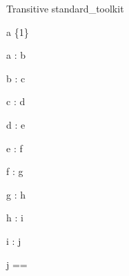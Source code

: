 \begin{zsection}
  \SECTION Transitive \parents standard\_toolkit
\end{zsection}

\begin{axdef}
\where
  a \in \{1\}
\end{axdef}

\begin{axdef}
  a : b
\end{axdef}

\begin{axdef}
  b : c
\end{axdef}

\begin{axdef}
  c : d
\end{axdef}

\begin{axdef}
  d : e
\end{axdef}

\begin{axdef}
  e : f
\end{axdef}

\begin{axdef}
  f : g
\end{axdef}

\begin{axdef}
  g : h
\end{axdef}

\begin{axdef}
  h : i
\end{axdef}

\begin{axdef}
  i : j
\end{axdef}

\begin{zed}
  j == \power\power\power\power\power\power\power\power\nat
\end{zed}
